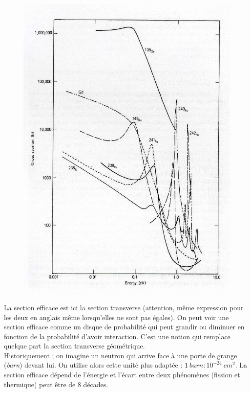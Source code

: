 	\begin{figure}
	\vspace{-8mm}
	\includegraphics[scale=0.13]{ch1/image3.png}
	\end{figure}
La section efficace est ici la section transverse (attention, même expression pour les deux en 
anglais même lorsqu'elles ne sont pas égales). On peut voir une section efficace comme un disque 
de probabilité qui peut grandir ou diminuer en fonction de la probabilité d'avoir interaction. C'est 
une notion qui remplace quelque part la section transverse géométrique.\\

Historiquement ; on imagine un neutron qui arrive face à une porte de grange (\textit{barn}) 
devant lui. On utilise alors cette unité plus adaptée : $1\ barn : 10^{-24}\ cm^2$. La section 
efficace dépend de l'énergie et l'écart entre deux phénomènes (fission et thermique) peut être 
de 8 décades.\\

